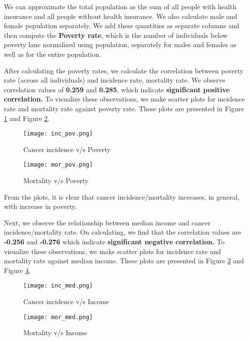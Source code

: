 \documentclass[conference]{IEEEtran}
\begin{document}
We can approximate the total population as the sum of all people with health insurance and all people without health insurance. We also calculate male and female population separately. We add these quantities as separate columns and then compute the \textbf{Poverty rate}, which is the number of individuals below poverty lane normalized using population, separately for males and females as well as for the entire population.

After calculating the poverty rates, we calculate the correlation between poverty rate (across all individuals) and incidence rate, mortality rate. We observe correlation values of \textbf{0.259} and \textbf{0.285}, which indicate \textbf{significant positive correlation.} To visualize these observations, we make scatter plots for incidence rate and mortality rate against poverty rate. These plots are presented in Figure \ref{inc_pov} and Figure \ref{mor_pov}.

\begin{figure}[tbh]
\centering
\texttt{[image: inc\_pov.png]}
\caption{Cancer incidence v/s Poverty}
\label{inc_pov}
\end{figure}

\begin{figure}[tbh]
\centering
\texttt{[image: mor\_pov.png]}
\caption{Mortality v/s Poverty}
\label{mor_pov}
\end{figure}

From the plots, it is clear that cancer incidence/mortality increases, in general, with increase in poverty.

Next, we observe the relationship between median income and cancer incidence/mortality rate. On calculating, we find that the correlation values are \textbf{-0.256} and \textbf{-0.276} which indicate \textbf{significant negative correlation.} To visualize these observations, we make scatter plots for incidence rate and mortality rate against median income. These plots are presented in Figure \ref{inc_med} and Figure \ref{mor_med}.

\begin{figure}[tbh]
\centering
\texttt{[image: inc\_med.png]}
\caption{Cancer incidence v/s Income}
\label{inc_med}
\end{figure}

\begin{figure}[tbh]
\centering
\texttt{[image: mor\_med.png]}
\caption{Mortality v/s Income}
\label{mor_med}
\end{figure}
    
\end{document}
